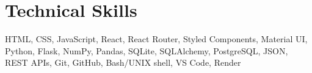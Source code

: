 \documentclass[a4paper,11pt]{article}
\newcommand{\resumeSectionType}[3]{
  \item\begin{tabular*}{0.96\textwidth}[t]{
    p{0.15\linewidth}p{0.02\linewidth}p{0.81\linewidth}
  }
    \textbf{#1} & #2 & #3
  \end{tabular*}\vspace{-2pt}
}
\newcommand{\resumeHeadingListStart}{
  \begin{itemize}[leftmargin=0.0in, label={}]
}
\newcommand{\resumeHeadingListEnd}{\end{itemize}}
\begin{document}
\section{Technical Skills}

HTML, CSS, JavaScript, React, React Router, Styled Components, Material UI, Python, Flask, NumPy, Pandas, SQLite, SQLAlchemy, PostgreSQL, JSON, REST APIs, Git, GitHub, Bash/UNIX shell, VS Code, Render


\end{document}
